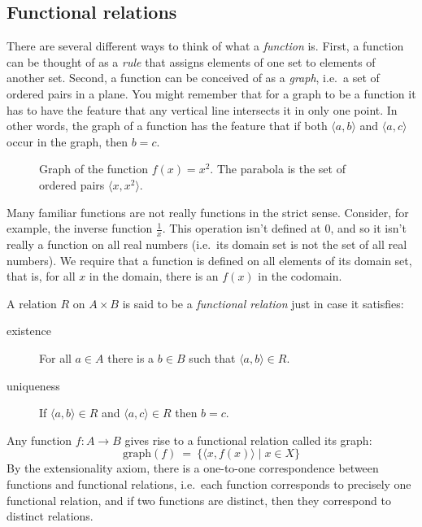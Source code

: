 \subsection{Functional relations}

There are several different ways to think of what a \emph{function}
is.  First, a function can be thought of as a {\it rule} that assigns
elements of one set to elements of another set.  Second, a function
can be conceived of as a {\it graph}, i.e.\ a set of ordered pairs in
a plane.  You might remember that for a graph to be a function it has
to have the feature that any vertical line intersects it in only one
point.  In other words, the graph of a function has the feature that
if both $\langle a,b\rangle$ and $\langle a,c\rangle$ occur in the
graph, then $b=c$.

\begin{figure}[h] \centering
{}
\caption{Graph of the function $f(x)=x^2$.  The parabola is the set
  of ordered pairs $\langle x,x^2\rangle$.}    
\end{figure}

Many familiar functions are not really functions in the strict sense.
Consider, for example, the inverse function $\frac{1}{x}$.  This
operation isn't defined at $0$, and so it isn't really a function on
all real numbers (i.e.\ its domain set is not the set of all real
numbers).  We require that a function is defined on all elements of
its domain set, that is, for all $x$ in the domain, there is an $f(x)$
in the codomain.

A relation $R$ on $A\times B$ is said to be a \emph{functional
  relation} just in case it satisfies:
\begin{description}
\item[existence] For all $a\in A$ there is a $b\in B$ such that
  $\langle a,b\rangle\in R$.
\item[uniqueness] If $\langle a,b\rangle \in R$ and $\langle
  a,c\rangle\in R$ then $b=c$.
\end{description}
Any function $f:A\to B$ gives rise to a functional relation called its
graph: 
\[ \mathrm{graph}(f) \: = \: \{ \langle x,f(x)\rangle \mid x\in X
  \} \] By the extensionality axiom, there is a one-to-one
correspondence between functions and functional relations, i.e.\ each
function corresponds to precisely one functional relation, and if two
functions are distinct, then they correspond to distinct relations.

